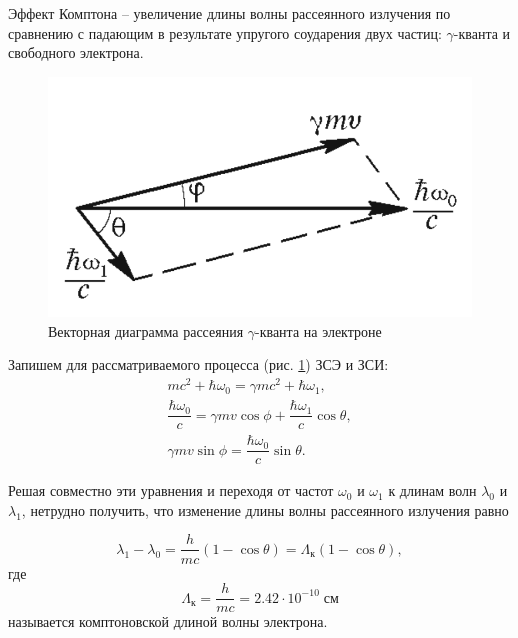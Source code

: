 \documentclass[a4paper, 12pt]{article}
\begin{document}
    Эффект Комптона -- увеличение длины волны рассеянного излучения по сравнению с падающим в результате упругого соударения двух частиц: $\gamma$-кванта и свободного электрона.

     \begin{figure}[H]
        \centering
        \includegraphics[scale = 0.25]{images/vector_diagram.png}
        \caption{Векторная диаграмма рассеяния $\gamma$-кванта на электроне}
        \label{diagram}
	\end{figure}

    Запишем для рассматриваемого процесса (рис. \ref{diagram}) ЗСЭ и ЗСИ:
	\begin{equation*}
	    \begin{gathered}
    	    m c^2 + \hbar \omega_0 = \gamma m c^2 +\hbar \omega_1,\\
    		\dfrac{\hbar \omega_0}{c} = \gamma m v \cos \phi + \dfrac{\hbar \omega_1}{c} \cos \theta,\\
    		\gamma m v \sin \phi = \dfrac{\hbar \omega_0}{c} \sin \theta.
	    \end{gathered}
	\end{equation*}

	Решая совместно эти уравнения и переходя от частот $ \omega_0 $ и $ \omega_1 $ к	длинам волн $ \lambda_0 $ и $ \lambda_1 $, нетрудно получить, что изменение длины волны	рассеянного излучения равно
 
	\begin{equation}
    \label{eq:main}
		\lambda_1 - \lambda_0 = \dfrac{h}{m c}\left(1- \cos \theta \right) = \Lambda_\text{к} \left(1- \cos \theta \right),
	\end{equation}
	где $$ \Lambda_\text{к} = \dfrac{h}{m c} = 2.42\cdot 10^{-10}\; см $$ называется комптоновской длиной волны электрона.
	
\end{document}
